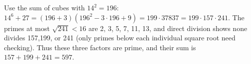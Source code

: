 Use the sum of cubes with $14^2=196$: $14^6+27=(196+3)(196^2-3\cdot196+9)=199\cdot37837=199\cdot157\cdot241$. The primes at most $\sqrt{241}<16$ are 2, 3, 5, 7, 11, 13, and direct division shows none divides 157,199, or 241 (only primes below each individual square root need checking). Thus these three factors are prime, and their sum is $157+199+241=\boxed{597}$.

